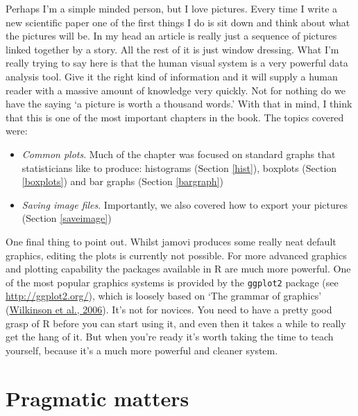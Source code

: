 \documentclass[
]{book}
\providecommand{\tightlist}{%
  \setlength{\itemsep}{0pt}\setlength{\parskip}{0pt}}
\begin{document}
Perhaps I'm a simple minded person, but I love pictures. Every time I write a new scientific paper one of the first things I do is sit down and think about what the pictures will be. In my head an article is really just a sequence of pictures linked together by a story. All the rest of it is just window dressing. What I'm really trying to say here is that the human visual system is a very powerful data analysis tool. Give it the right kind of information and it will supply a human reader with a massive amount of knowledge very quickly. Not for nothing do we have the saying `a picture is worth a thousand words.' With that in mind, I think that this is one of the most important chapters in the book. The topics covered were:

\begin{itemize}
\tightlist
\item
  \emph{Common plots}. Much of the chapter was focused on standard graphs that statisticians like to produce: histograms (Section \ref{hist}), boxplots (Section \ref{boxplots}) and bar graphs (Section \ref{bargraph})
\item
  \emph{Saving image files}. Importantly, we also covered how to export your pictures (Section \ref{saveimage})
\end{itemize}

One final thing to point out. Whilst jamovi produces some really neat default graphics, editing the plots is currently not possible. For more advanced graphics and plotting capability the packages available in R are much more powerful. One of the most popular graphics systems is provided by the \texttt{ggplot2} package (see \url{http://ggplot2.org/}), which is loosely based on `The grammar of graphics' (\protect\hyperlink{ref-Wilkinson2006}{Wilkinson et al., 2006}). It's not for novices. You need to have a pretty good grasp of R before you can start using it, and even then it takes a while to really get the hang of it. But when you're ready it's worth taking the time to teach yourself, because it's a much more powerful and cleaner system.

\hypertarget{datahandling}{%
\chapter{Pragmatic matters}\label{datahandling}}
\end{document}
